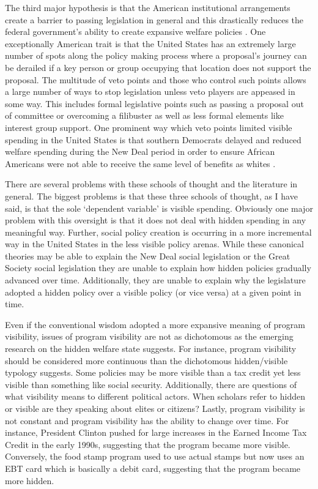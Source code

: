 \documentclass[12pt]{article}
\begin{document}
The third major hypothesis is that the American institutional arrangements create a barrier to passing legislation in general and this drastically reduces the federal government's ability to create expansive welfare policies \citep{pierson1995, robertson2011}. One exceptionally American trait is that the United States has an extremely large number of spots along the policy making process where a proposal's journey can be derailed if a key person or group occupying that location does not support the proposal. The multitude of veto points and those who control such points allows a large number of ways to stop legislation unless veto players are appeased in some way. This includes formal legislative points such as passing a proposal out of committee or overcoming a filibuster as well as less formal elements like interest group support. One prominent way which veto points limited visible spending in the United States is that southern Democrats delayed and reduced welfare spending during the New Deal period in order to ensure African Americans were not able to receive the same level of benefits as whites \citep{katznelson2013}. 

There are several problems with these schools of thought and the literature in general. The biggest problems is that these three schools of thought, as I have said, is that the sole `dependent variable' is visible spending. Obviously one major problem with this oversight is that it does not deal with hidden spending in any meaningful way. Further, social policy creation is occurring in a more incremental way in the United States in the less visible policy arenas. While these canonical theories may be able to explain the New Deal social legislation or the Great Society social legislation they are unable to explain how hidden policies gradually advanced over time. Additionally, they are unable to explain why the legislature adopted a hidden policy over a visible policy (or vice versa) at a given point in time.

Even if the conventional wisdom adopted a more expansive meaning of program visibility, issues of program visibility are not as dichotomous as the emerging research on the hidden welfare state suggests. For instance, program visibility should be considered more continuous than the dichotomous hidden/visible typology suggests. Some policies may be more visible than a tax credit yet less visible than something like social security. Additionally, there are questions of what visibility means to different political actors. When scholars refer to hidden or visible are they speaking about elites or citizens? Lastly, program visibility is not constant and program visibility has the ability to change over time. For instance, President Clinton pushed for large increases in the Earned Income Tax Credit in the early 1990s, suggesting that the program became more visible. Conversely, the food stamp program used to use actual stamps but now uses an EBT card which is basically a debit card, suggesting that the program became more hidden.
\end{document}
